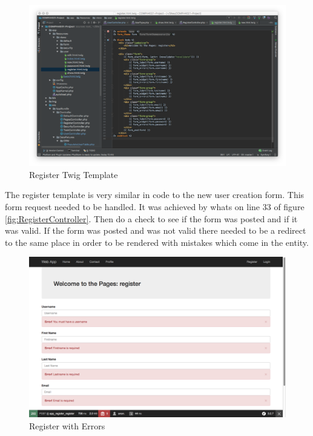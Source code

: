 \begin{figure}[htbp]
   \centering
   \includegraphics[width=400pt]{figures/register_html_twig.png} %
   \caption{Register Twig Template}
   \label{fig:Register Twig Template}
\end{figure}

The register template is very similar in code to the new user creation form. This form request needed to be handled. It was achieved by whats on line 33 of figure \ref{fig:RegisterController}. Then do a check to see if the form was posted and if it was valid. If the form was posted and was not valid there needed to be a redirect to the same place in order to be rendered with mistakes which come in the entity.

\begin{figure}[htbp]
   \centering
   \includegraphics[width=400pt]{figures/register_errors.png} %
   \caption{Register with Errors}
   \label{fig:Register with Errors}
\end{figure}

